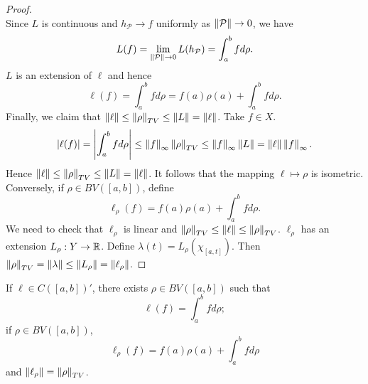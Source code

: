 \begin{proof}
\begin{equation*}
    \end{equation*}
    Since $L$ is continuous and $h_{\mathcal{P}}\to f$ uniformly as 
    $\left\lVert {\mathcal{P}} \right\rVert\to 0$, we have 
    \begin{equation*}
        L(f) = \lim_{\left\lVert {\mathcal{P}} \right\rVert\to 0} L(h_{\mathcal{P}}) 
        = \int_{a}^{b} fd\rho.
    \end{equation*} 
    $L$ is an extension of $\ell$ and hence  
    \begin{equation*}
        \ell(f) = \int_{a}^{b} fd\rho = f(a)\rho(a) + \int_{a}^{b} fd\rho.
    \end{equation*}
    Finally, we claim that $\left\lVert {\ell} \right\rVert\leq\left\lVert {\rho} \right\rVert_{TV}\leq\left\lVert {L} \right\rVert
    =\left\lVert {\ell} \right\rVert$. Take $f\in X$. 
    \begin{equation*}
        \left\lvert {\ell(f)} \right\rvert = \left\lvert {\int_{a}^{b} fd\rho} \right\rvert \leq \left\lVert {f} \right\rVert_{\infty}\left\lVert {\rho} \right\rVert_{TV} 
        \leq \left\lVert {f} \right\rVert_{\infty}\left\lVert {L} \right\rVert = \left\lVert {\ell} \right\rVert\left\lVert {f} \right\rVert_{\infty}.
    \end{equation*}
    Hence $\left\lVert {\ell} \right\rVert\leq\left\lVert {\rho} \right\rVert_{TV}\leq\left\lVert {L} \right\rVert = \left\lVert {\ell} \right\rVert$. 
    It follows that the mapping $\ell\mapsto\rho$ is isometric. Conversely, 
    if $\rho\in BV([a,b])$, define 
    \begin{equation*}
        \ell_{\rho}(f) = f(a)\rho(a) + \int_{a}^{b} fd\rho.
    \end{equation*} 
    We need to check that $\ell_{\rho}$ is linear and 
    $\left\lVert {\rho} \right\rVert_{TV}\leq\left\lVert {\ell} \right\rVert\leq\left\lVert {\rho} \right\rVert_{TV}$. $\ell_\rho$ 
    has an extension $L_\rho:Y\to\mathbb{R}$. Define 
    $\lambda(t) = L_\rho(\chi_{[a,t]})$. Then $\left\lVert {\rho} \right\rVert_{TV}=\left\lVert {\lambda} \right\rVert
    \leq\left\lVert {L_{\rho}} \right\rVert=\left\lVert {\ell_\rho} \right\rVert$.
\end{proof}
\begin{remark}
    If $\ell\in C([a,b])'$, there exists $\rho\in BV([a,b])$ such that 
    \begin{equation*}
        \ell(f) = \int_{a}^{b} fd\rho;
    \end{equation*}
    if $\rho\in BV([a,b])$, 
    \begin{equation*}
        \ell_{\rho}(f) = f(a)\rho(a) + \int_{a}^{b} fd\rho
    \end{equation*}
    and $\left\lVert {\ell_\rho} \right\rVert = \left\lVert {\rho} \right\rVert_{TV}$.
\end{remark}
